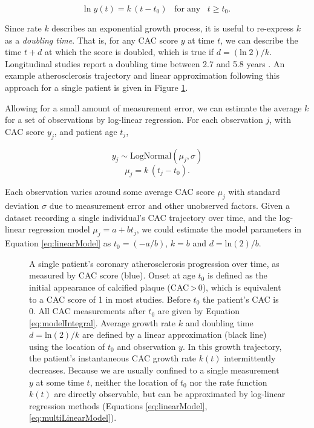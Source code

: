 \documentclass[a4paper, 10pt]{article}
\begin{document}
\begin{equation}
  \label{eq:modelSolution}
  \mathrm{ln}\;y(t) = k\,(t - t_0)\;\;\;\mathrm{for\;any}\;\;\;t \geq t_0.
\end{equation}

Since rate $k$ describes an exponential growth process, it is useful to re-express $k$ as a \textit{doubling time}. That is, for any CAC score $y$ at time $t$, we can describe the time $t + d$ at which the score is doubled, which is true if $d = (\mathrm{ln}\;2)/k$. Longitudinal studies report a doubling time between 2.7 and 5.8 years \cite{houslay2006progressive, ikegami2018rate}. An example atherosclerosis trajectory and linear approximation following this approach for a single patient is given in Figure \ref{fig:singleTrajectory}.

Allowing for a small amount of measurement error, we can estimate the average $k$ for a set of observations by log-linear regression. For each observation $j$, with CAC score $y_j$, and patient age $t_j$,

$$
  y_j \sim \mathrm{LogNormal}(\mu_j, \sigma)
$$
\begin{equation}
  \label{eq:linearModel}
  \mu_j = k\,(t_j - t_0).
\end{equation}

Each observation varies around some average CAC score $\mu_j$ with standard deviation $\sigma$ due to measurement error and other unobserved factors. Given a dataset recording a single individual's CAC trajectory over time, and the log-linear regression model $\mu_j = a + bt_j$, we could estimate the model parameters in Equation \ref{eq:linearModel} as $t_0 = (-a/b)$, $k = b$ and $d = \mathrm{ln}(2)/b$.

\begin{figure}[ht]
  \centering
  
  \caption{A single patient's coronary atherosclerosis progression over time, as measured by CAC score (blue). Onset at age $t_0$ is defined as the initial appearance of calcified plaque (CAC\,>\,0), which is equivalent to a CAC score of 1 in most studies. Before $t_0$ the patient's CAC is 0. All CAC measurements after $t_0$ are given by Equation \ref{eq:modelIntegral}. Average growth rate $k$ and doubling time $d = \mathrm{ln}(2)/k$ are defined by a linear approximation (black line) using the location of $t_0$ and observation $y$. In this growth trajectory, the patient's instantaneous CAC growth rate $k(t)$ intermittently decreases. Because we are usually confined to a single measurement $y$ at some time $t$, neither the location of $t_0$ nor the rate function $k(t)$ are directly observable, but can be approximated by log-linear regression methods (Equations \ref{eq:linearModel}, \ref{eq:multiLinearModel}).}
  \label{fig:singleTrajectory}
\end{figure}
\end{document}
